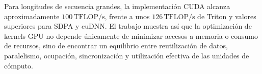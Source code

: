 Para longitudes de secuencia grandes, la implementación CUDA alcanza aproximadamente \(100\,\text{TFLOP/s}\), frente a unos \(126\,\text{TFLOP/s}\) de Triton y valores superiores para SDPA y cuDNN. El trabajo muestra así que la optimización de kernels GPU no depende únicamente de minimizar accesos a memoria o consumo de recursos, sino de encontrar un equilibrio entre reutilización de datos, paralelismo, ocupación, sincronización y utilización efectiva de las unidades de cómputo.

